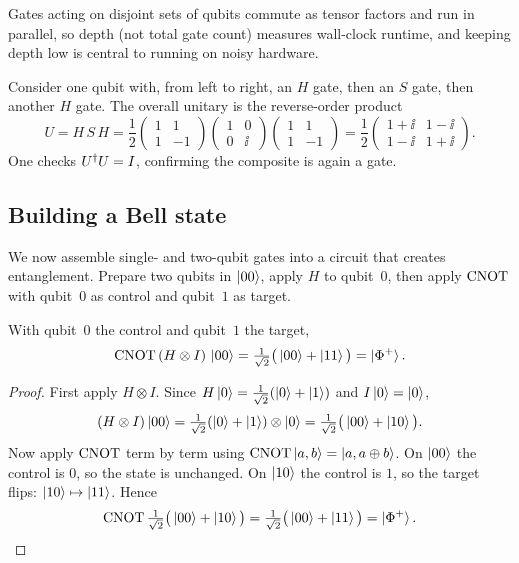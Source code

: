 Gates acting on disjoint sets of qubits commute as tensor factors and run in
parallel, so depth (not total gate count) measures wall-clock runtime, and keeping
depth low is central to running on noisy hardware.

\begin{example}
Consider one qubit with, from left to right, an $H$ gate, then an $S$ gate, then
another $H$ gate. The overall unitary is the reverse-order product
\[
  U = H\,S\,H
    = \frac{1}{2}\begin{pmatrix}1&1\\1&-1\end{pmatrix}
      \begin{pmatrix}1&0\\0&\ii\end{pmatrix}
      \begin{pmatrix}1&1\\1&-1\end{pmatrix}
    = \frac{1}{2}\begin{pmatrix}1+\ii&1-\ii\\1-\ii&1+\ii\end{pmatrix}.
\]
One checks $U^{\dagger} U=I$, confirming the composite is again a gate.
\end{example}

\subsection{Building a Bell state}

We now assemble single- and two-qubit gates into a circuit that creates entanglement.
Prepare two qubits in $\ket{00}$, apply $H$ to qubit~$0$, then apply $\mathrm{CNOT}$ with
qubit~$0$ as control and qubit~$1$ as target.

\begin{theorem}\label{thm:lec01-bellprep}
With qubit~$0$ the control and qubit~$1$ the target,
\[
  \mathrm{CNOT}\,(H\otimes I)\,\ket{00}
    = \tfrac{1}{\sqrt2}\big(\ket{00}+\ket{11}\big)=\ket{\Phi^{+}}.
\]
\end{theorem}

\begin{proof}
First apply $H\otimes I$. Since $H\ket{0}=\tfrac{1}{\sqrt2}(\ket{0}+\ket{1})$ and
$I\ket{0}=\ket{0}$,
\[
  (H\otimes I)\ket{00}
    = \tfrac{1}{\sqrt2}(\ket{0}+\ket{1})\otimes\ket{0}
    = \tfrac{1}{\sqrt2}\big(\ket{00}+\ket{10}\big).
\]
Now apply $\mathrm{CNOT}$ term by term using $\mathrm{CNOT}\ket{a,b}=\ket{a,a\oplus b}$. On $\ket{00}$
the control is $0$, so the state is unchanged. On $\ket{10}$ the control is $1$, so
the target flips: $\ket{10}\mapsto\ket{11}$. Hence
\[
  \mathrm{CNOT}\,\tfrac{1}{\sqrt2}\big(\ket{00}+\ket{10}\big)
    = \tfrac{1}{\sqrt2}\big(\ket{00}+\ket{11}\big)=\ket{\Phi^{+}}. \qedhere
\]
\end{proof}

